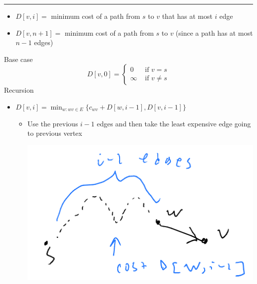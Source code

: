 \documentclass[11pt]{article}
\begin{document}
\noindent\rule{\textwidth}{0.5pt}
\begin{itemize}
\item \(D[v,i]=\) minimum cost of a path from \(s\) to \(v\) that has at most \(i\) edge
\item \(D[v,n + 1]=\) minimum cost of a path from \(s\) to \(v\) (since a path has at most \(n-1\) edges)
\end{itemize}
Base case
\begin{equation*}
D[v,0] = 
\begin{cases}
0 & \text{ if }v=s
\\ \infty & \text{ if } v \neq s
\end{cases}
\end{equation*}
Recursion
\begin{itemize}
\item \(D[v,i]=\min_{w:wv\in E}\{c_{wv}+D[w,i-1],D[v,i-1]\}\)
\begin{itemize}
\item Use the previous \(i-1\) edges and then take the least expensive edge going to previous vertex
\begin{center}
\includegraphics[width=.9\linewidth]{./Images/i98.png}
\end{center}
\end{itemize}
\end{itemize}
\end{document}

